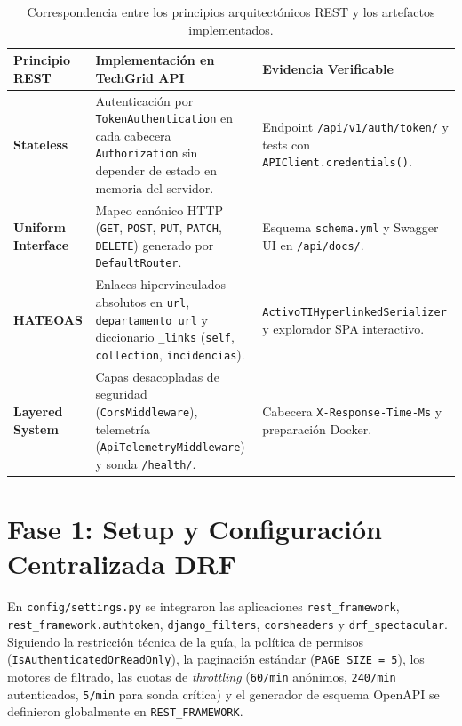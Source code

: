 \documentclass[10pt,a4paper]{article}
\begin{document}
\begin{table}[H]
\centering
\small
\begin{tabularx}{\textwidth}{p{3.0cm} X X}
\toprule
\textbf{\color{uncpnavy}Principio REST} & \textbf{\color{uncpnavy}Implementación en TechGrid API} & \textbf{\color{uncpnavy}Evidencia Verificable} \\
\midrule
\textbf{Stateless} & Autenticación por \texttt{TokenAuthentication} en cada cabecera \texttt{Authorization} sin depender de estado en memoria del servidor. & Endpoint \texttt{/api/v1/auth/token/} y tests con \texttt{APIClient.credentials()}. \\
\addlinespace
\textbf{Uniform Interface} & Mapeo canónico HTTP (\texttt{GET}, \texttt{POST}, \texttt{PUT}, \texttt{PATCH}, \texttt{DELETE}) generado por \texttt{DefaultRouter}. & Esquema \texttt{schema.yml} y Swagger UI en \texttt{/api/docs/}. \\
\addlinespace
\textbf{HATEOAS} & Enlaces hipervinculados absolutos en \texttt{url}, \texttt{departamento\_url} y diccionario \texttt{\_links} (\texttt{self}, \texttt{collection}, \texttt{incidencias}). & \texttt{ActivoTIHyperlinkedSerializer} y explorador SPA interactivo. \\
\addlinespace
\textbf{Layered System} & Capas desacopladas de seguridad (\texttt{CorsMiddleware}), telemetría (\texttt{ApiTelemetryMiddleware}) y sonda \texttt{/health/}. & Cabecera \texttt{X-Response-Time-Ms} y preparación Docker. \\
\bottomrule
\end{tabularx}
\caption{Correspondencia entre los principios arquitectónicos REST y los artefactos implementados.}
\label{tab:principios_rest}
\end{table}

\newpage

\section{Fase 1: Setup y Configuración Centralizada DRF}
En \texttt{config/settings.py} se integraron las aplicaciones \texttt{rest\_framework}, \texttt{rest\_framework.authtoken}, \texttt{django\_filters}, \texttt{corsheaders} y \texttt{drf\_spectacular}. Siguiendo la restricción técnica de la guía, la política de permisos (\texttt{IsAuthenticatedOrReadOnly}), la paginación estándar (\texttt{PAGE\_SIZE = 5}), los motores de filtrado, las cuotas de \textit{throttling} (\texttt{60/min} anónimos, \texttt{240/min} autenticados, \texttt{5/min} para sonda crítica) y el generador de esquema OpenAPI se definieron globalmente en \texttt{REST\_FRAMEWORK}.
\end{document}
